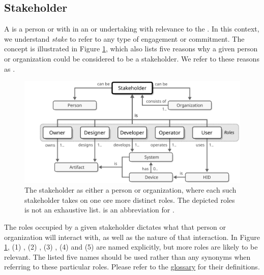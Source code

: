 \subsection{Stakeholder}
\label{sec:reference-model:stakeholder}

A  is a person or  with  in an  or undertaking with relevance to the .
In this context, we understand \textit{stake} to refer to any type of engagement or commitment.
The concept is illustrated in Figure \ref{fig:stakeholder}, which also lists five reasons why a given person or organization could be considered to be a stakeholder.
We refer to these reasons as .

\begin{figure}[ht!]
  \centering
  \includegraphics[scale=0.9]{figures/stakeholder}
  \caption{
    The stakeholder as either a person or organization, where each such stakeholder takes on one ore more distinct roles.
    The depicted roles is not an exhaustive list.
     is an abbreviation for .
  }
  \label{fig:stakeholder}
\end{figure}

The roles occupied by a given stakeholder dictates what  that person or organization will interact with, as well as the nature of that interaction.
In Figure \ref{fig:stakeholder}, (1) , (2) , (3) , (4)  and (5)  are named explicitly, but more roles are likely to be relevant.
The listed five names should be used rather than any synonyms when referring to these particular roles.
Please refer to the \hyperref[sec:glossary]{glossary} for their definitions.

